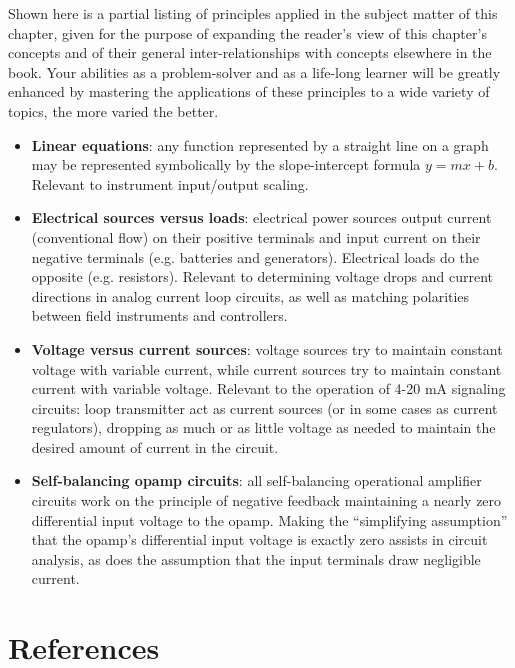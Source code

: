 Shown here is a partial listing of principles applied in the subject matter of this chapter, given for the purpose of expanding the reader's view of this chapter's concepts and of their general inter-relationships with concepts elsewhere in the book.  Your abilities as a problem-solver and as a life-long learner will be greatly enhanced by mastering the applications of these principles to a wide variety of topics, the more varied the better.

\begin{itemize}
\item \textbf{Linear equations}: any function represented by a straight line on a graph may be represented symbolically by the slope-intercept formula $y = mx + b$.  Relevant to instrument input/output scaling.
\item \textbf{Electrical sources versus loads}: electrical power sources output current (conventional flow) on their positive terminals and input current on their negative terminals (e.g. batteries and generators).  Electrical loads do the opposite (e.g. resistors).  Relevant to determining voltage drops and current directions in analog current loop circuits, as well as matching polarities between field instruments and controllers.
\item \textbf{Voltage versus current sources}: voltage sources try to maintain constant voltage with variable current, while current sources try to maintain constant current with variable voltage.  Relevant to the operation of 4-20 mA signaling circuits: loop transmitter act as current sources (or in some cases as current regulators), dropping as much or as little voltage as needed to maintain the desired amount of current in the circuit.
\item \textbf{Self-balancing opamp circuits}: all self-balancing operational amplifier circuits work on the principle of negative feedback maintaining a nearly zero differential input voltage to the opamp.  Making the ``simplifying assumption'' that the opamp's differential input voltage is exactly zero assists in circuit analysis, as does the assumption that the input terminals draw negligible current.
\end{itemize}







\filbreak
\section*{References}

